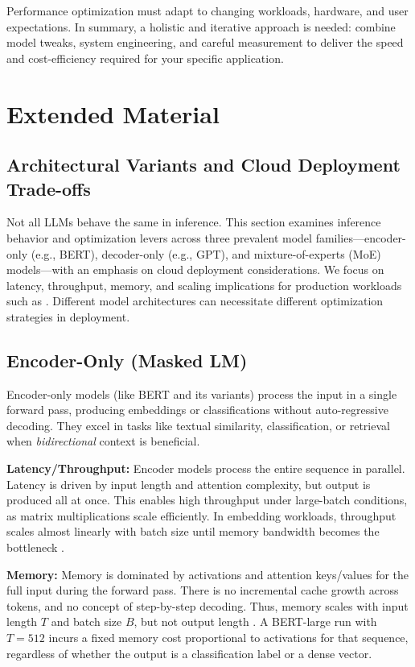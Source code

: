 Performance optimization must adapt to changing workloads, hardware, and user expectations. In summary, a holistic and iterative approach is needed: combine model tweaks, system engineering, and careful measurement to deliver the speed and cost-efficiency required for your specific application.


\FloatBarrier
\section{Extended Material}\label{sec:perf-extended}

\subsection{Architectural Variants and Cloud Deployment Trade-offs}\label{sec:perf-variants}
\label{sec:arch-variants}

Not all LLMs behave the same in inference. This section examines inference behavior and optimization levers across three prevalent model families---encoder-only (e.g., BERT), decoder-only (e.g., GPT), and mixture-of-experts (MoE) models---with an emphasis on cloud deployment considerations. We focus on latency, throughput, memory, and scaling implications for production workloads such as \ishtar{}. Different model architectures can necessitate different optimization strategies in deployment.

\subsection{Encoder-Only (Masked LM)}
Encoder-only models (like BERT and its variants) process the input in a single forward pass, producing embeddings or classifications without auto-regressive decoding. They excel in tasks like textual similarity, classification, or retrieval when \emph{bidirectional} context is beneficial.

\textbf{Latency/Throughput:} Encoder models process the entire sequence in parallel. Latency is driven by input length and attention complexity, but output is produced all at once. This enables high throughput under large-batch conditions, as matrix multiplications scale efficiently. In embedding workloads, throughput scales almost linearly with batch size until memory bandwidth becomes the bottleneck \cite{bert-original,encoder-ops}.

\textbf{Memory:} Memory is dominated by activations and attention keys/values for the full input during the forward pass. There is no incremental cache growth across tokens, and no concept of step-by-step decoding. Thus, memory scales with input length $T$ and batch size $B$, but not output length \cite{bert-original}. A BERT-large run with $T=512$ incurs a fixed memory cost proportional to activations for that sequence, regardless of whether the output is a classification label or a dense vector.

